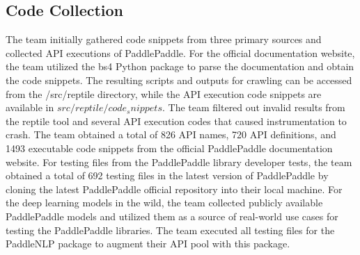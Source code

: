 \documentclass[sigconf]{acmart}
\begin{document}
\subsection{Code Collection}
The team initially gathered code snippets from three primary sources and collected API executions of PaddlePaddle. 
For the official documentation website, the team utilized the bs4 Python package to parse the documentation and obtain the code snippets. 
The resulting scripts and outputs for crawling can be accessed from the /src/reptile directory, while the API execution code snippets are available in $src/reptile/code_snippets$. 
The team filtered out invalid results from the reptile tool and several API execution codes that caused instrumentation to crash. 
The team obtained a total of 826 API names, 720 API definitions, and 1493 executable code snippets from the official PaddlePaddle documentation website. 
For testing files from the PaddlePaddle library developer tests, the team obtained a total of 692 testing files in the latest version of PaddlePaddle by cloning the latest PaddlePaddle official repository into their local machine. 
For the deep learning models in the wild, the team collected publicly available PaddlePaddle models and utilized them as a source of real-world use cases for testing the PaddlePaddle libraries. 
The team executed all testing files for the PaddleNLP package to augment their API pool with this package.
\end{document}
